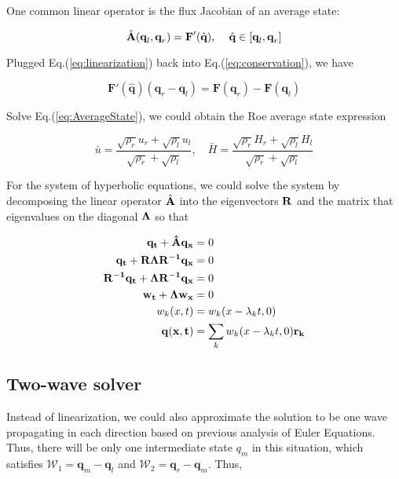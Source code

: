 \documentclass[11pt]{diazessay} %
\begin{document}
One common linear operator is the flux Jacobian of an average state:

\begin{equation}\label{eq:linearization}
    \hat{\bf{A}}(\textbf{q}_l, \textbf{q}_r) = \textbf{F}'(\hat{\textbf{q}})\text{, }\quad \hat{\textbf{q}}\in[\textbf{q}_l, \textbf{q}_r]
\end{equation}

Plugged Eq.(\ref{eq:linearization}) back into Eq.(\ref{eq:conservation}), we have


\begin{equation}\label{eq:AverageState}
    \textbf{F}'(\hat{\textbf{q}})(\textbf{q}_r-\textbf{q}_l) = \textbf{F}(\textbf{q}_r) - \textbf{F}(\textbf{q}_l)
\end{equation}

Solve Eq.(\ref{eq:AverageState}), we could obtain the Roe average state expression

\begin{equation}
    \bar{u} = \frac{\sqrt{\rho_r}u_r + \sqrt{\rho_l}u_l}{\sqrt{\rho_r}+\sqrt{\rho_l}}, \quad \bar{H} =\frac{\sqrt{\rho_r}H_r + \sqrt{\rho_l}H_l}{\sqrt{\rho_r}+\sqrt{\rho_l}}
\end{equation}

For the system of hyperbolic equations, we could solve the system by decomposing the linear operator $\hat{\bf{A}}$ into the eigenvectors $\bf{R}$ and the matrix that eigenvalues on the diagonal $\bf{\Lambda}$ so that

$$
\begin{aligned}
    \bf{q}_t + \hat{\bf{A}} \bf{q}_x  &= 0\\
    \bf{q}_t + \bf{R}\Lambda\bf{R}^{-1}\bf{q}_x & = 0\\
    \bf{R}^{-1}\bf{q}_t + \Lambda\bf{R}^{-1}\bf{q}_x & = 0\\
    \bf{w}_t + \Lambda\bf{w}_x & = 0\\
    w_k(x, t) & = w_k(x-\lambda_k t, 0)\\
    \bf{q}(x, t) & = \sum_k w_k(x-\lambda_k t, 0) \bf{r_k}
\end{aligned}
$$


\subsection{Two-wave solver}

Instead of linearization, we could also approximate the solution to be one wave propagating in each direction based on previous analysis of Euler Equations. Thus, there will be only one intermediate state $q_m$ in this situation, which satisfies $\mathcal{W}_1=\textbf{q}_m-\textbf{q}_l$ and $\mathcal{W}_2=\textbf{q}_r-\textbf{q}_m$. Thus,
\end{document}
